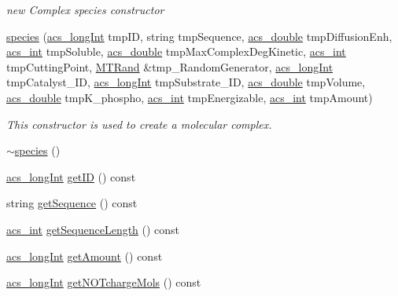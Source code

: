 \begin{DoxyCompactItemize}
\begin{DoxyCompactList}\small\item\em new Complex species constructor \end{DoxyCompactList}\item 
\hyperlink{a00022_a492478eb509138dff0be715a70d741ac}{species} (\hyperlink{a00050_a19319d75f02db4308bc5c0026d98cd85}{acs\-\_\-long\-Int} tmp\-I\-D, string tmp\-Sequence, \hyperlink{a00050_ab776853a005fcbf56af0424a2a4dd607}{acs\-\_\-double} tmp\-Diffusion\-Enh, \hyperlink{a00050_a8d277355641a098190360234e2ebde35}{acs\-\_\-int} tmp\-Soluble, \hyperlink{a00050_ab776853a005fcbf56af0424a2a4dd607}{acs\-\_\-double} tmp\-Max\-Complex\-Deg\-Kinetic, \hyperlink{a00050_a8d277355641a098190360234e2ebde35}{acs\-\_\-int} tmp\-Cutting\-Point, \hyperlink{a00016}{M\-T\-Rand} \&tmp\-\_\-\-Random\-Generator, \hyperlink{a00050_a19319d75f02db4308bc5c0026d98cd85}{acs\-\_\-long\-Int} tmp\-Catalyst\-\_\-\-I\-D, \hyperlink{a00050_a19319d75f02db4308bc5c0026d98cd85}{acs\-\_\-long\-Int} tmp\-Substrate\-\_\-\-I\-D, \hyperlink{a00050_ab776853a005fcbf56af0424a2a4dd607}{acs\-\_\-double} tmp\-Volume, \hyperlink{a00050_ab776853a005fcbf56af0424a2a4dd607}{acs\-\_\-double} tmp\-K\-\_\-phospho, \hyperlink{a00050_a8d277355641a098190360234e2ebde35}{acs\-\_\-int} tmp\-Energizable, \hyperlink{a00050_a8d277355641a098190360234e2ebde35}{acs\-\_\-int} tmp\-Amount)
\begin{DoxyCompactList}\small\item\em This constructor is used to create a molecular complex. \end{DoxyCompactList}\item 
\hyperlink{a00022_a4ec3e21535ff68a06dba4e1eed935dc0}{$\sim$species} ()
\item 
\hyperlink{a00050_a19319d75f02db4308bc5c0026d98cd85}{acs\-\_\-long\-Int} \hyperlink{a00022_a59f2a9963c10fcb3748153c73c9c7072}{get\-I\-D} () const 
\item 
string \hyperlink{a00022_a553019883dd1344a7f15b805453e46d1}{get\-Sequence} () const 
\item 
\hyperlink{a00050_a8d277355641a098190360234e2ebde35}{acs\-\_\-int} \hyperlink{a00022_ade5b59eab17c02ff322dcf068f923f9d}{get\-Sequence\-Length} () const 
\item 
\hyperlink{a00050_a19319d75f02db4308bc5c0026d98cd85}{acs\-\_\-long\-Int} \hyperlink{a00022_a53c74ca3861c4cdac2457e7057fbef21}{get\-Amount} () const 
\item 
\hyperlink{a00050_a19319d75f02db4308bc5c0026d98cd85}{acs\-\_\-long\-Int} \hyperlink{a00022_af7293ab371ab92d6d16866ea281e901a}{get\-N\-O\-Tcharge\-Mols} () const 

\end{DoxyCompactItemize}
